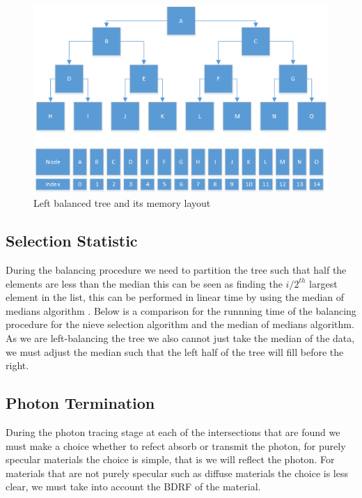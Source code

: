 \begin{figure}
\centering
\includegraphics[scale=0.75]{./implementation/left-balanced-tree.png}
\caption{Left balanced tree and its memory layout}
\end{figure}

\subsection{Selection Statistic}
During the balancing procedure we need to partition the tree such that half the elements are less than the median
this can be seen as finding the $i/2^{th}$ largest element in the list, this can be performed in linear time by using
the median of medians algorithm . Below is a comparison for the runnning time of the balancing procedure for
the nieve selection algorithm and the median of medians algorithm. As we are left-balancing the tree we also cannot
just take the median of the data, we must adjust the median such that the left half of the tree will fill before the right.


\subsection{Photon Termination}
During the photon tracing stage at each of the intersections that are found we must make a choice whether to refect absorb or transmit
the photon, for purely specular materials the choice is simple, that is we will reflect the photon. For materials that are not purely
specular such as diffuse materials the choice is less clear, we must take into account the BDRF of the material.

